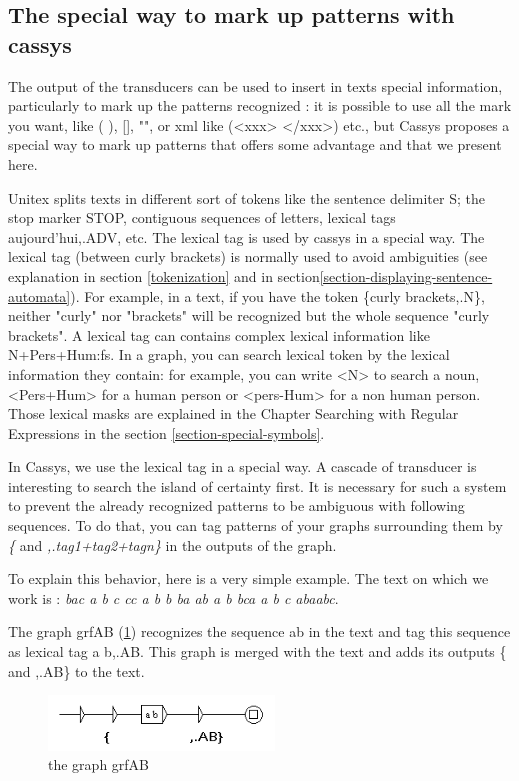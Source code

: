\subsection{The special way to mark up patterns with cassys}

The output of the transducers can be used to insert in texts special information, particularly to mark up the patterns recognized : it is 
possible to use all the mark you want, like ( ), [], "", or xml like (<xxx> </xxx>) etc., but Cassys proposes a special way to 
mark up patterns that offers some advantage and that we present here.  

\bigskip
\noindent Unitex splits texts in different sort of tokens like the sentence delimiter {S}; the stop marker {STOP}, contiguous 
sequences of letters, lexical tags {aujourd'hui,.ADV}, etc. The lexical tag is used by cassys in a special way. The lexical tag (between curly brackets) is normally used to avoid ambiguities (see explanation in section \ref{tokenization} and in section\ref{section-displaying-sentence-automata}). 
For example, in a text, if you have the token \{curly brackets,.N\}, neither "curly" nor "brackets" will be recognized but the whole sequence 
"curly brackets". A lexical tag can contains complex lexical information like N+Pers+Hum:fs.
In a graph, you can search lexical token by the lexical information they contain: for example, you can write <N> to search 
a noun, <Pers+Hum> for a human person or <pers-Hum> for a non human person. Those lexical masks are explained in the Chapter Searching with Regular Expressions in the section \ref{section-special-symbols}.
 
\bigskip
\noindent In Cassys, we use the lexical tag in a special way. A cascade of transducer is interesting to search the island of certainty first. It is necessary for such a system to prevent the already recognized patterns to be ambiguous with following sequences. To do that, you can tag patterns of your graphs surrounding them by \emph{\{} and \emph{,.tag1+tag2+tagn\}} in the outputs of the graph.

\bigskip
\noindent To explain this behavior, here is a very simple example. The text on which we work is :
\emph{bac a b c cc a b b ba ab a b bca a b c abaabc}.

\bigskip
\noindent The graph grfAB (\ref{fig13-05}) recognizes the sequence ab in the text and tag this sequence as lexical tag {a b,.AB}. This graph is merged with the text and adds its outputs \{ and ,.AB\} to the text. 

\begin{figure}[!htb]
  \centering
  \includegraphics[width=6cm]{resources/img/fig13-05.png}
  \caption{the graph grfAB}
  \label{fig13-05}
\end{figure}

